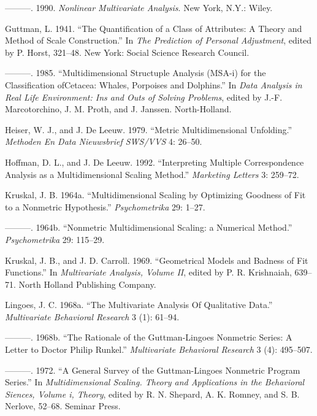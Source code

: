 \documentclass[
  12pt,
  letterpaper,
  DIV=11,
  numbers=noendperiod]{scrartcl}
\newlength{\cslhangindent}
\newenvironment{CSLReferences}[2] %
 {\begin{list}{}{%
  \setlength{\itemindent}{0pt}
  \setlength{\leftmargin}{0pt}
  \setlength{\parsep}{0pt}
  \ifodd #1
   \setlength{\leftmargin}{\cslhangindent}
   \setlength{\itemindent}{-1\cslhangindent}
  \fi
  \setlength{\itemsep}{#2\baselineskip}}}
 {\end{list}}
\begin{document}
\begin{CSLReferences}{1}{0}
---------. 1990. \emph{Nonlinear Multivariate Analysis}. New York, N.Y.:
Wiley.

Guttman, L. 1941. {``{The Quantification of a Class of Attributes: A
Theory and Method of Scale Construction}.''} In \emph{The Prediction of
Personal Adjustment}, edited by P. Horst, 321--48. New York: Social
Science Research Council.

---------. 1985. {``Multidimensional Structuple Analysis (MSA-i) for the
Classification ofCetacea: Whales, Porpoises and Dolphins.''} In
\emph{Data Analysis in Real Life Environment: Ins and Outs of Solving
Problems}, edited by J.-F. Marcotorchino, J. M. Proth, and J. Janssen.
North-Holland.

Heiser, W. J., and J. De Leeuw. 1979. {``Metric Multidimensional
Unfolding.''} \emph{Methoden En Data Nieuwsbrief SWS/VVS} 4: 26--50.

Hoffman, D. L., and J. De Leeuw. 1992. {``Interpreting Multiple
Correspondence Analysis as a Multidimensional Scaling Method.''}
\emph{Marketing Letters} 3: 259--72.

Kruskal, J. B. 1964a. {``{Multidimensional Scaling by Optimizing
Goodness of Fit to a Nonmetric Hypothesis}.''} \emph{Psychometrika} 29:
1--27.

---------. 1964b. {``{Nonmetric Multidimensional Scaling: a Numerical
Method}.''} \emph{Psychometrika} 29: 115--29.

Kruskal, J. B., and J. D. Carroll. 1969. {``{Geometrical Models and
Badness of Fit Functions}.''} In \emph{Multivariate Analysis, Volume
II}, edited by P. R. Krishnaiah, 639--71. North Holland Publishing
Company.

Lingoes, J. C. 1968a. {``{The Multivariate Analysis Of Qualitative
Data}.''} \emph{Multivariate Behavioral Research} 3 (1): 61--94.

---------. 1968b. {``{The Rationale of the Guttman-Lingoes Nonmetric
Series: A Letter to Doctor Philip Runkel}.''} \emph{Multivariate
Behavioral Research} 3 (4): 495--507.

---------. 1972. {``A General Survey of the Guttman-Lingoes Nonmetric
Program Series.''} In \emph{Multidimensional Scaling. Theory and
Applications in the Behavioral Siences, Volume i, Theory}, edited by R.
N. Shepard, A. K. Romney, and S. B. Nerlove, 52--68. Seminar Press.


\end{CSLReferences}
\end{document}
